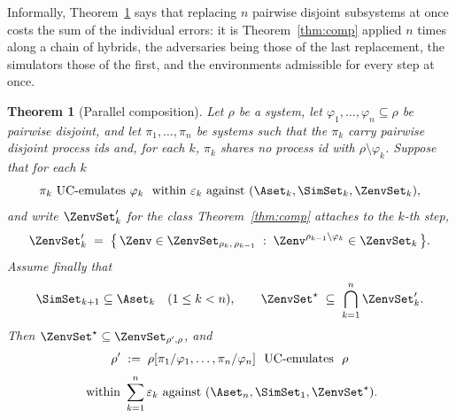 \documentclass[10pt,oneside,openany]{book}
\theoremstyle{accentdef}
\theoremstyle{accentplain}
\newtheorem{theorem}[definition]{Theorem}
\begin{document}
Informally, Theorem~\ref{thm:parcomp} says that replacing $n$ pairwise disjoint subsystems at
once costs the sum of the individual errors: it is Theorem~\ref{thm:comp} applied $n$ times
along a chain of hybrids, the adversaries being those of the last replacement, the simulators
those of the first, and the environments admissible for every step at once.

\begin{theorem}[Parallel composition]\label{thm:parcomp}
Let $\rho$ be a system, let $\varphi_1,\dots,\varphi_n \subseteq \rho$ be pairwise disjoint,
and let $\pi_1,\dots,\pi_n$ be systems such that the $\pi_k$ carry pairwise disjoint process
ids and, for each $k$, $\pi_k$ shares no process id with $\rho \setminus \varphi_k$. Suppose
that for each $k$
\[
  \pi_k \ \text{UC-emulates} \ \varphi_k \ \text{ within } \varepsilon_k \text{ against } (\Aset_k,\SimSet_k,\ZenvSet_k) ,
\]
and write $\ZenvSet_k'$ for the class Theorem~\ref{thm:comp} attaches to the $k$-th step,
\[
  \ZenvSet_k' \;=\; \bigl\{\, \Zenv \in \ZenvSet_{\rho_k,\,\rho_{k-1}} \;:\; \Zenv^{\rho_{k-1} \setminus \varphi_k} \in \ZenvSet_k \,\bigr\} .
\]
Assume finally that
\[
  \SimSet_{k+1} \subseteq \Aset_k \quad (1 \leq k < n),
  \qquad
  \ZenvSet^{\star} \;\subseteq\; \bigcap_{k=1}^{n} \ZenvSet_k' .
\]
Then $\ZenvSet^{\star} \subseteq \ZenvSet_{\rho',\rho}$, and
\[
  \begin{gathered}
  \rho' \;:=\; \rho[\pi_1/\varphi_1,\dots,\pi_n/\varphi_n]
  \ \text{ UC-emulates } \ \rho \\[3pt]
  \text{ within } \sum_{k=1}^{n} \varepsilon_k
  \text{ against } (\Aset_n,\SimSet_1,\ZenvSet^{\star}) .
  \end{gathered}
\]
\end{theorem}
\end{document}
